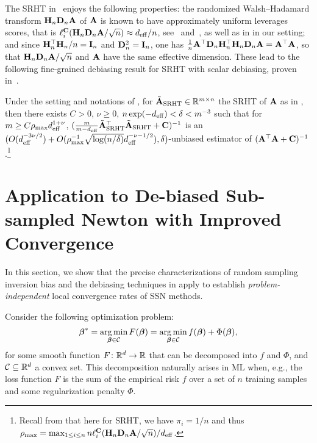 \documentclass[11pt,a4paper]{article}
\begin{document}
The SRHT in~ enjoys the following properties: 
the randomized Walsh--Hadamard transform $\mathbf{H}_n \mathbf{D}_n \mathbf{A}$ of $\mathbf{A}$ is known to have approximately uniform leverages scores, that is $\ell^{\mathbf{C}}_i (\mathbf{H}_n \mathbf{D}_n \mathbf{A}/\sqrt{n}) \approx d_{\mathrm{eff}}/n$, see~\citet{drineas2011faster} and~\citet[Theorems~3.1~and~3.2]{tropp2011improved}, as well as  in  in our setting; and
since $\mathbf{H}_{n}^\top \mathbf{H}_n/n = \mathbf{I}_n $ and $\mathbf{D}^2_n=\mathbf{I}_n$, one has $\frac1n \mathbf{A}^\top \mathbf{D}_n \mathbf{H}_n^\top \mathbf{H}_n \mathbf{D}_n \mathbf{A} =\mathbf{A}^\top\mathbf{A}$, so that $\mathbf{H}_n \mathbf{D}_n \mathbf{A}/\sqrt n$ and $\mathbf{A}$ have the same effective dimension.
These lead to the following fine-grained debiasing result for SRHT with scalar debiasing, proven in~.

\begin{corollary}\label{coro:debiasing_srht} 
Under the setting and notations of , for $\tilde{\mathbf{A}}_{\rm SRHT} \in {\mathbb{R}}^{m \times n}$ the SRHT of $\mathbf{A}$ as in , then there exists $C> 0$, $\nu \geq 0$, $n \exp(-d_{\mathrm{eff}}) < \delta < m^{-3}$ such that
for   $m\geq C\rho_{\max} d_{\mathrm{eff}}^{1+\nu}$, $(\frac{m}{m-d_{\mathrm{eff}}}\tilde{\mathbf{A}}_{\rm SRHT}^\top \tilde{\mathbf{A}}_{\rm SRHT} + \mathbf{C} )^{-1}$ is an $(O(d_{\mathrm{eff}}^{-3\nu/2})+O( \rho^{-1}_{\max} \sqrt{\log(n/\delta)} d_{\mathrm{eff}}^{-\nu-1/2}),\delta)$-unbiased estimator of $(\mathbf{A}^\top  \mathbf{A} + \mathbf{C})^{-1}$.\footnote{Recall from  that here for SRHT, we have $\pi_i=1/n$ and thus $\rho_{\max} = \max_{1\leq i \leq n}n\ell^{\mathbf{C}}_i (\mathbf{H}_n \mathbf{D}_n \mathbf{A}/\sqrt{n})/d_{\mathrm{eff}} $. }
\end{corollary}

 

\section{Application to De-biased Sub-sampled Newton with Improved Convergence}  
\label{sec:application}

In this section, we show that the precise characterizations of random sampling inversion bias and the debiasing techniques in  apply to establish \emph{problem-independent} local convergence rates of SSN methods.

Consider the following optimization problem:
\begin{equation}\label{eq:optimization_problem}
    \boldsymbol{\beta}^\ast= \operatorname*{arg\,min}_{\boldsymbol{\beta}\in \mathcal{C}} F(\boldsymbol{\beta})=\operatorname*{arg\,min}_{\boldsymbol{\beta}\in \mathcal{C} } f(\boldsymbol{\beta}) + \Phi(\boldsymbol{\beta}),
\end{equation}
for some smooth function $F \colon {\mathbb{R}}^d \to {\mathbb{R}}$ that can be decomposed into $f$ and $\Phi$, and $\mathcal{C}\subseteq {\mathbb{R}}^d$ a convex set.
This decomposition naturally arises in ML when, e.g., the loss function $F$ is the sum of the empirical risk $f$ over a set of $n$ training samples and some regularization penalty $\Phi$.
\end{document}
